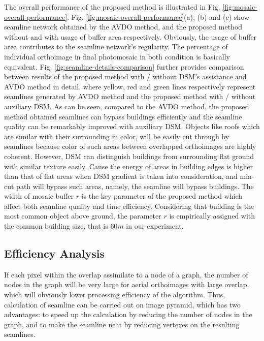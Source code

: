\documentclass[journal]{IEEEtran}
\begin{document}
The overall performance of the proposed method is illustrated in Fig. \ref{fig:mosaic-overall-performance}. Fig. \ref{fig:mosaic-overall-performance}(a), (b) and (c) show seamline network obtained by the AVDO method, and the proposed method without and with usage of buffer area respectively. Obviously, the usage of buffer area contributes to the seamline network's regularity. The percentage of individual orthoimage in final photomosaic in both condition is basically equivalent.  Fig. \ref{fig:seamline-details-comparison} further provides comparison between results of the proposed method with / without DSM's assistance and AVDO method in detail, where yellow, red and green lines respectively represent seamlines generated by AVDO method and the proposed method with / without auxiliary DSM. As can be seen, compared to the AVDO method, the proposed method obtained seamlines can bypass buildings efficiently and the  seamline quality can be remarkably improved with auxiliary DSM. Objects like roofs which are similar with their surrounding in color, will be easily cut through by seamlines because color of such areas between overlapped orthoimages are highly coherent. However, DSM can distinguish buildings from surrounding flat ground with similar texture easily. Cause the energy of areas in building edges is higher than that of flat areas when DSM gradient is taken into consideration, and min-cut path will bypass such areas, namely, the seamline will bypass buildings. The width of mosaic buffer $r$ is the key parameter of the proposed method which affect both seamline quality and time efficiency. Considering that building is the most common object above ground, the parameter $r$ is empirically assigned with the common building size, that is $60m$ in our experiment.
\subsection{Efficiency Analysis}
If each pixel within the overlap assimilate to a node of a graph, the number of nodes in the graph will be very large for aerial orthoimages with large overlap, which will obviously lower processing efficiency of the algorithm. Thus, calculation of seamline can be carried out on image pyramid, which has two advantages: to speed up the calculation by reducing the number of nodes in the graph, and to make the seamline neat by reducing vertexes on the resulting seamlines.
\end{document}
